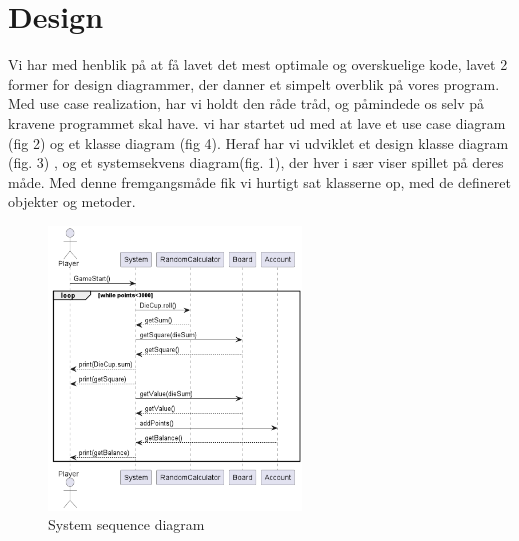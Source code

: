 \documentclass{article}
\begin{document}
\section{Design}
Vi har med henblik på at få lavet det mest optimale og overskuelige kode, lavet 2 former for design diagrammer, der danner et simpelt overblik på vores program. Med use case realization, har vi holdt den råde tråd, og påmindede os selv på kravene programmet skal have. vi har startet ud med at lave et use case diagram (fig 2) og et klasse diagram (fig 4). Heraf har vi udviklet et design klasse diagram (fig. 3) , og et systemsekvens diagram(fig. 1), der hver i sær viser spillet på deres måde. Med denne fremgangsmåde fik vi hurtigt sat klasserne op, med de defineret objekter og metoder.
\\
\begin{figure} [h]
    \centering
    \includegraphics[width = 0.6\textwidth] {Billeder/System sequence diagram.png}
    \caption{System sequence diagram}
    \label{fig:Systemssekvensdiagram}
\end{figure}
\\
\end{document}
